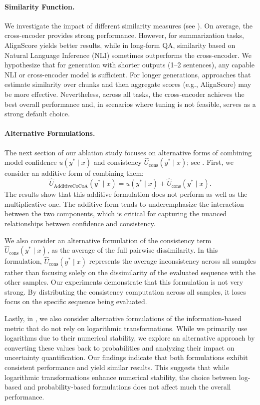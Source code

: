 \paragraph{Similarity Function.}
We investigate the impact of different similarity measures (see ). On average, the cross-encoder provides strong performance. However, for summarization tasks, AlignScore yields better results, while in long-form QA, similarity based on Natural Language Inference (NLI) sometimes outperforms the cross-encoder. We hypothesize that for generation with shorter outputs (1--2 sentences), any capable NLI or cross-encoder model is sufficient. For longer generations, approaches that estimate similarity over chunks and then aggregate scores (e.g., AlignScore) may be more effective. Nevertheless, across all tasks, the cross-encoder achieves the best overall performance and, in scenarios where tuning is not feasible, serves as a strong default choice.

\paragraph{Alternative Formulations.}
The next section of our ablation study focuses on alternative forms of combining model confidence $u(y^{*} \mid x)$ and consistency $\hat{U}_{\mathrm{cons}}(y^{*} \mid x)$; see . First, we consider an additive form of combining them:
\begin{equation}
  \hat{U}_{\text{AdditiveCoCoA}}(y^{*} \mid x)
    = u(y^{*} \mid x) + \hat{U}_{\mathrm{cons}}(y^{*} \mid x).
  \label{eq:additive_cocoa}
\end{equation}
The results show that this additive formulation does not perform as well as the multiplicative one. The additive form tends to underemphasize the interaction between the two components, which is critical for capturing the nuanced relationships between confidence and consistency.

We also consider an alternative formulation of the consistency term $\hat{U}_{\mathrm{cons}}(y^{*} \mid x)$, as the average of the full pairwise dissimilarity. In this formulation, $\hat{U}_{\mathrm{cons}}(y^{*} \mid x)$ represents the average inconsistency across all samples rather than focusing solely on the dissimilarity of the evaluated sequence with the other samples. Our experiments demonstrate that this formulation is not very strong. By distributing the consistency computation across all samples, it loses focus on the specific sequence being evaluated.

Lastly, in , we also consider alternative formulations of the information-based metric that do not rely on logarithmic transformations. While we primarily use logarithms due to their numerical stability, we explore an alternative approach by converting these values back to probabilities and analyzing their impact on uncertainty quantification. Our findings indicate that both formulations exhibit consistent performance and yield similar results. This suggests that while logarithmic transformations enhance numerical stability, the choice between log-based and probability-based formulations does not affect much the overall performance.
